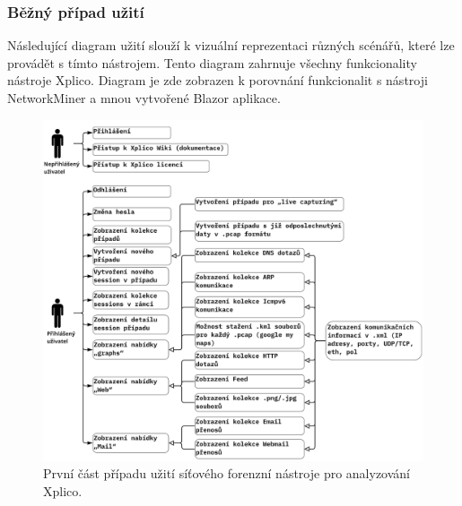         \subsubsection*{Běžný případ užití}
            Následující diagram užití slouží k vizuální reprezentaci různých scénářů, které lze provádět s tímto nástrojem. Tento diagram zahrnuje všechny funkcionality nástroje Xplico. Diagram je zde zobrazen k porovnání funkcionalit s nástroji NetworkMiner a mnou vytvořené Blazor aplikace.
                \begin{figure}[H]
                    \centering
                    \includegraphics[scale=0.1]{obrazky-figures/usecases/Xplico_usecase1.jpg}
                    \caption{První část případu užití síťového forenzní nástroje pro analyzování Xplico.}
                    \label{fig:my_label}
                \end{figure}
